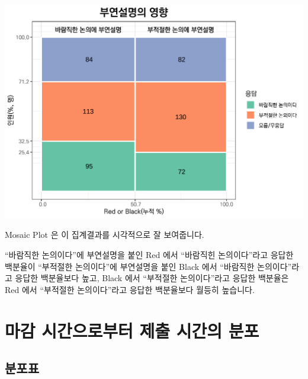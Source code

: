 \documentclass[
]{book}
\begin{document}
\includegraphics{Quiz_report_2025_files/figure-latex/unnamed-chunk-14-1.pdf}

Mosaic Plot 은 이 집계결과를 시각적으로 잘 보여줍니다.

``바람직한 논의이다''에 부연설명을 붙인 Red 에서 ``바람직힌 논의이다''라고 응답한 백분율이 ``부적절한 논의이다''에 부연설명을 붙인 Black 에서 ``바람직한 논의이다''라고 응답한 백분율보다 높고, Black 에서 ``부적절한 논의이다''라고 응답한 백분율은 Red 에서 ``부적절한 논의이다''라고 응답한 백분율보다 월등히 높습니다.

\section{마감 시간으로부터 제출 시간의 분포}\label{uxb9c8uxac10-uxc2dcuxac04uxc73cuxb85cuxbd80uxd130-uxc81cuxcd9c-uxc2dcuxac04uxc758-uxbd84uxd3ec}

\subsection{분포표}\label{uxbd84uxd3ecuxd45c}
\end{document}
